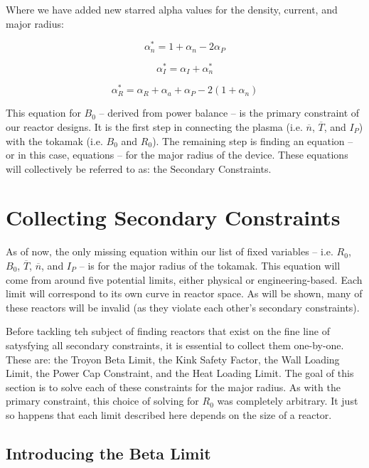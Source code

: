 \documentclass[11pt]{book}
\begin{document}
Where we have added new starred alpha values for the density, current, and major radius:

\begin{equation}
  \alpha_n^* = 1+\alpha_n-2\alpha_P
\end{equation}

\begin{equation}
  \alpha_I^* = \alpha_I + \alpha_n^*
\end{equation}

\begin{equation}
  \alpha_R^* = \alpha_R+ \alpha_a +\alpha_P-2 (1+\alpha_n )
\end{equation}

This equation for $B_0$ -- derived from power balance -- is the primary constraint of our reactor designs. It is the first step in connecting the plasma (i.e. $\overline n$, $\overline T$, and $I_P$) with the tokamak (i.e. $B_0$ and $R_0$). The remaining step is finding an equation -- or in this case, equations -- for the major radius of the device. These equations will collectively be referred to as: the Secondary Constraints.

\section{Collecting Secondary Constraints}

As of now, the only missing equation within our list of fixed variables -- i.e. $R_0$, $B_0$, $\overline T$, $\overline n$, and $I_P$ -- is for the major radius of the tokamak. This equation will come from around five potential limits, either physical or engineering-based. Each limit will correspond to its own curve in reactor space. As will be shown, many of these reactors will be invalid (as they violate each other's secondary constraints).

Before tackling teh subject of finding reactors that exist on the fine line of satysfying all secondary constraints, it is essential to collect them one-by-one. These are: the Troyon Beta Limit, the Kink Safety Factor, the Wall Loading Limit, the Power Cap Constraint, and the Heat Loading Limit. The goal of this section is to solve each of these constraints for the major radius. As with the primary constraint, this choice of solving for $R_0$ was completely arbitrary. It just so happens that each limit described here depends on the size of a reactor.

\subsection{Introducing the Beta Limit}
\end{document}

